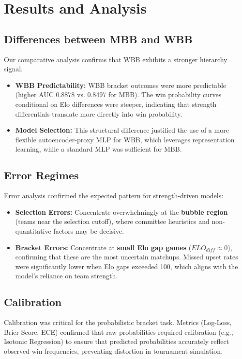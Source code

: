 \documentclass[runningheads]{llncs}
\begin{document}
\section{Results and Analysis}
\subsection{Differences between MBB and WBB}
Our comparative analysis confirms that WBB exhibits a stronger hierarchy signal.
\begin{itemize}
    \item \textbf{WBB Predictability:} WBB bracket outcomes were more predictable (higher AUC 0.8878 vs. 0.8497 for MBB). The win probability curves conditional on Elo differences were steeper, indicating that strength differentials translate more directly into win probability.
    \item \textbf{Model Selection:} This structural difference justified the use of a more flexible autoencoder-proxy MLP for WBB, which leverages representation learning, while a standard MLP was sufficient for MBB.
\end{itemize}
\subsection{Error Regimes}
Error analysis confirmed the expected pattern for strength-driven models:
\begin{itemize}
    \item \textbf{Selection Errors:} Concentrate overwhelmingly at the \textbf{bubble region} (teams near the selection cutoff), where committee heuristics and non-quantitative factors may be decisive.
    \item \textbf{Bracket Errors:} Concentrate at \textbf{small Elo gap games} ($ELO_{diff} \approx{0}$), confirming that these are the most uncertain matchups. Missed upset rates were significantly lower when Elo gaps exceeded 100, which aligns with the model's reliance on team strength.
\end{itemize}
\subsection{Calibration}
Calibration was critical for the probabilistic bracket task. Metrics (Log-Loss, Brier Score, ECE) confirmed that raw probabilities required calibration (e.g., Isotonic Regression) to ensure that predicted probabilities accurately reflect observed win frequencies, preventing distortion in tournament simulation.
\end{document}
